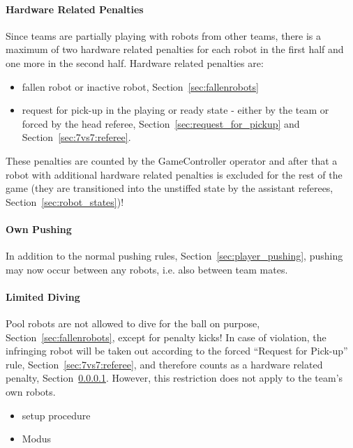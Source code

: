         \paragraph{Hardware Related Penalties}
            \label{sec:7vs7:hardware_related_penalties}
            Since teams are partially playing with robots from other teams, there is a maximum of two hardware related penalties for each robot in the first half and one more in the second half. 
            Hardware related penalties are:
            \begin{itemize}
                \item fallen robot or inactive robot, \cf Section~\ref{sec:fallenrobots}
                \item request for pick-up in the playing or ready state - either by the team or forced by the head referee, \cf Section~\ref{sec:request_for_pickup} and Section~\ref{sec:7vs7:referee}. 
            \end{itemize}
            These penalties are counted by the GameController operator and after that a robot with additional hardware related penalties is excluded for the rest of the game (they are transitioned into the unstiffed state by the assistant referees, \cf Section~\ref{sec:robot_states})!

        \paragraph{Own Pushing}
            In addition to the normal pushing rules, \cf Section~\ref{sec:player_pushing}, pushing may now occur between any robots, i.e. also between team mates.

        \paragraph{Limited Diving}
            Pool robots are not allowed to dive for the ball on purpose, \cf Section~\ref{sec:fallenrobots}, except for penalty kicks! In case of violation, the infringing robot will be taken out according to the forced ``Request for Pick-up'' rule, \cf Section~\ref{sec:7vs7:referee}, and therefore counts as a hardware related penalty, \cf Section~\ref{sec:7vs7:hardware_related_penalties}. However, this restriction does not apply to the team's own robots. 

        \begin{itemize}
            \item setup procedure %
            \item Modus %
        \end{itemize}


